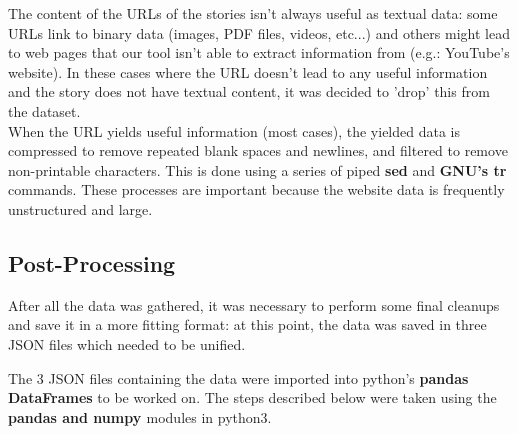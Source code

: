 \documentclass[sigconf]{acmart}
\begin{document}
The content of the URLs of the stories isn't always useful as textual
data: some URLs link to binary data (images, PDF files, videos, etc...)
and others might lead to web pages that our tool isn't able to extract
information from (e.g.: YouTube's website). In these cases where the URL
doesn't lead to any useful information and the story does not have
textual content, it was decided to 'drop' this from the dataset.\\
When the URL yields useful information (most cases), the yielded
data is compressed to remove repeated blank spaces and newlines,
and filtered to remove non-printable characters. This is done using
a series of piped \textbf{sed} and \textbf{GNU's tr} commands. These
processes are important because the website data is frequently
unstructured and large.

\subsection{Post-Processing}
\label{sec:post_processing}
After all the data was gathered, it was necessary to perform some
final cleanups and save it in a more fitting format: at this point,
the data was saved in three JSON files which needed to be unified.

The 3 JSON files containing the data were imported into python's
\textbf{pandas \cite{pandas} DataFrames} to be worked on. The steps described
below were taken using the \textbf{pandas\cite{pandas} and numpy \cite{numpy}} modules in
python3.
\end{document}
